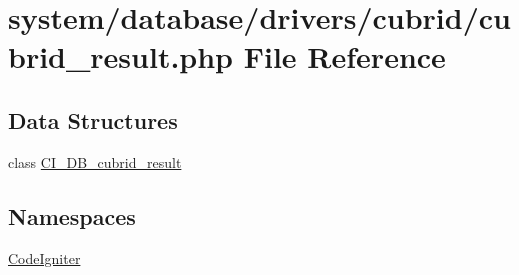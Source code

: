 \hypertarget{cubrid__result_8php}{}\section{system/database/drivers/cubrid/cubrid\+\_\+result.php File Reference}
\label{cubrid__result_8php}
\subsection*{Data Structures}
\begin{DoxyCompactItemize}
\item 
class \mbox{\hyperlink{class_c_i___d_b__cubrid__result}{C\+I\+\_\+\+D\+B\+\_\+cubrid\+\_\+result}}
\end{DoxyCompactItemize}
\subsection*{Namespaces}
\begin{DoxyCompactItemize}
\item 
 \mbox{\hyperlink{namespace_code_igniter}{Code\+Igniter}}
\end{DoxyCompactItemize}
